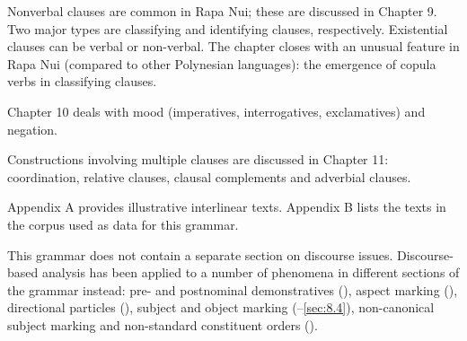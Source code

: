 Nonverbal clauses are common in Rapa Nui; these are discussed in Chapter 9. Two major types are classifying and identifying clauses, respectively. Existential clauses can be verbal or non-verbal. The chapter closes with an unusual feature in Rapa Nui (compared to other Polynesian languages): the emergence of copula verbs in classifying clauses.

Chapter 10 deals with mood (imperatives, interrogatives, exclamatives) and negation. 

Constructions involving multiple clauses are discussed in Chapter 11: coordination, relative clauses, clausal complements and adverbial clauses.

Appendix A provides illustrative interlinear texts. Appendix B lists the texts in the corpus used as data for this grammar.

This grammar does not contain a separate section on discourse issues. 
Discourse-based analysis has been applied to a number of phenomena in different sections of the grammar instead: pre- and postnominal demonstratives (), aspect marking (), directional particles (), subject and object marking (–\ref{sec:8.4}), non-canonical subject marking and non-standard constituent orders ().
